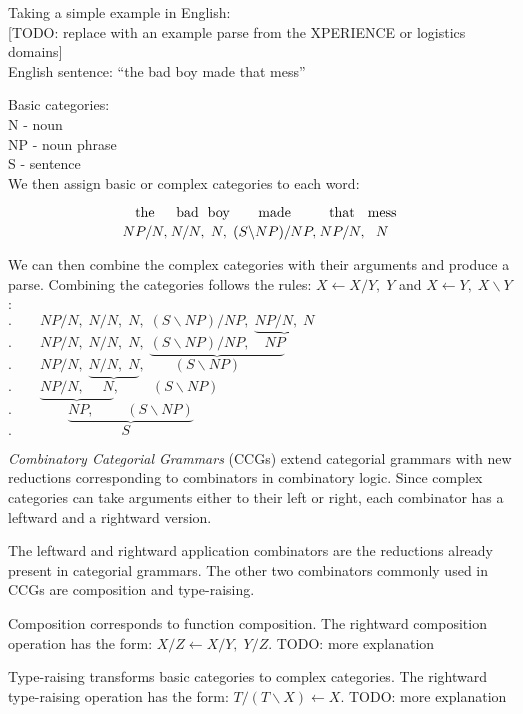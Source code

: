 Taking a simple example in English:\\

[TODO: replace with an example parse from the XPERIENCE or logistics domains]\\

English sentence: ``the bad boy made that mess''

Basic categories:\\
N - noun\\
NP - noun phrase\\
S - sentence\\

We then assign basic or complex categories to each word:

$$
{\text{the}\atop {NP/N,}}
{\text{bad}\atop {N/N,}}
{\text{boy}\atop {N,}}
{\text{made}\atop {(S \backslash NP)/NP,}}
{\text{that}\atop {NP/N,}}
{\text{mess}\atop {N}}
$$

We can then combine the complex categories with their arguments and produce a parse. Combining the categories follows the rules: $ X\leftarrow X/Y,\; Y$ and $ X\leftarrow Y,\; X\backslash Y$:\\
$.\qquad NP/N,\; N/N,\; N,\; (S\backslash NP)/NP,\; \underbrace{NP/N,\; N}$\\
$.\qquad NP/N,\; N/N,\; N,\; \underbrace{(S\backslash NP)/NP, \quad NP}$\\
$.\qquad NP/N,\; \underbrace{N/N,\; N}, \qquad (S\backslash NP)$\\
$.\qquad \underbrace{NP/N,\; \quad N},\; \qquad (S\backslash NP)$\\
$.\qquad \qquad\underbrace{NP,\; \qquad (S\backslash NP)}$\\
$.\qquad \qquad\qquad\quad\;\;\; S$


\emph{Combinatory Categorial Grammars} (CCGs) extend categorial grammars with new reductions corresponding to combinators in combinatory logic. Since complex categories can take arguments either to their left or right, each combinator has a leftward and a rightward version.

The leftward and rightward application combinators are the reductions already present in categorial grammars. The other two combinators commonly used in CCGs are composition and type-raising.

Composition corresponds to function composition. The rightward composition operation has the form: $X/Z \leftarrow X/Y,\;  Y/Z$. TODO: more explanation

Type-raising transforms basic categories to complex categories. The rightward type-raising operation has the form: $T/(T\backslash X) \leftarrow X$. TODO: more explanation

